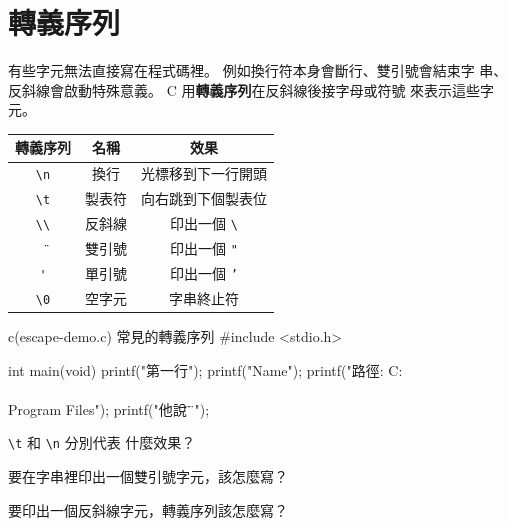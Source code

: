 \section{轉義序列}
\label{sec:char-escape}

有些字元無法直接寫在程式碼裡。 例如換行符本身會斷行、雙引號會結束字
串、反斜線會啟動特殊意義。 C 用\textbf{轉義序列}在反斜線後接字母或符號
來表示這些字元。

\begin{center}
\begin{tabular}{|c|c|c|}
\hline
\textbf{轉義序列} & \textbf{名稱} & \textbf{效果} \\
\hline
\texttt{\textbackslash n} & 換行 & 光標移到下一行開頭 \\
\texttt{\textbackslash t} & 製表符 & 向右跳到下個製表位 \\
\texttt{\textbackslash\textbackslash} & 反斜線 & 印出一個 \texttt{\textbackslash} \\
\texttt{\"} & 雙引號 & 印出一個 \texttt{"} \\
\texttt{\'} & 單引號 & 印出一個 \texttt{'} \\
\texttt{\textbackslash 0} & 空字元 & 字串終止符 \\
\hline
\end{tabular}
\end{center}

\begin{example}{c}{(escape-demo.c) 常見的轉義序列}
#include <stdio.h>

int main(void) {
    printf("第一行\n");
    printf("Name\tAge\n");
    printf("路徑: C:\\\\Program Files\n");
    printf("他說\"你好\"\n");
}
\end{example}


\begin{drills}[label=drills:char-escape]
\item \texttt{\textbackslash t} 和 \texttt{\textbackslash n} 分別代表
什麼效果？
\item 要在字串裡印出一個雙引號字元，該怎麼寫？
\item 要印出一個反斜線字元，轉義序列該怎麼寫？
\end{drills}

